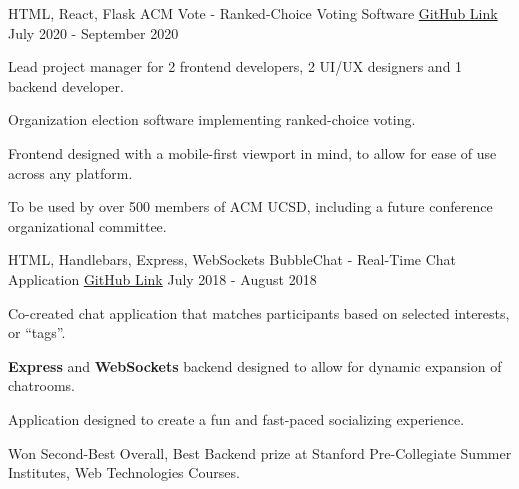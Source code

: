 
\begin{cventries}
  \cventry
    {HTML, React, Flask}
    {ACM Vote - Ranked-Choice Voting Software}
    {\href{https://github.com/acmucsd/acm-vote}{GitHub Link}}
    {July 2020 - September 2020}
    {
      \begin{cvitems}
        \item {Lead project manager for 2 frontend developers, 2 UI/UX designers and 1 backend developer.}
        \item {Organization election software implementing ranked-choice voting.}
        \item {Frontend designed with a mobile-first viewport in mind, to allow for ease of use across any platform.}
        \item {To be used by over 500 members of ACM UCSD, including a future conference organizational committee.}
      \end{cvitems}
    }
  \cventry
    {HTML, Handlebars, Express, WebSockets}
    {BubbleChat - Real-Time Chat Application}
    {\href{https://github.com/StormFireFox1/BubbleChat}{GitHub Link}}
    {July 2018 - August 2018}
    {
      \begin{cvitems}
        \item {Co-created chat application that matches participants based on selected interests, or ``tags''.}
        \item {\textbf{Express} and \textbf{WebSockets} backend designed to allow for dynamic expansion of chatrooms.}
        \item {Application designed to create a fun and fast-paced socializing experience.}
        \item {Won Second-Best Overall, Best Backend prize at Stanford Pre-Collegiate Summer Institutes, Web Technologies Courses.}
      \end{cvitems}
    }

\end{cventries}
